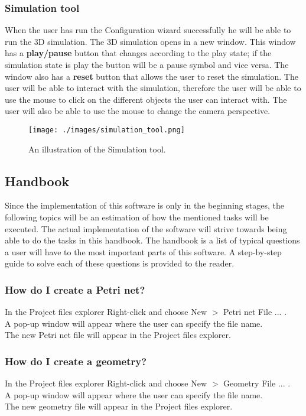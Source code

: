 \documentclass[fontsize=12pt, paper=a4]{article}
\begin{document}
\subsubsection{Simulation tool}
When the user has run the Configuration wizard successfully he will be able to run the 3D simulation. The 3D simulation opens in a new window. This window has a \textbf{play/pause} button that changes according to the play state; if the simulation state is play the button will be a pause symbol and vice versa. The window also has a \textbf{reset} button that allows the user to reset the simulation.
The user will be able to interact with the simulation, therefore the user will be able to use the mouse to click on the different objects the user can interact with. The user will also be able to use the mouse to change the camera perspective.

\begin{figure}[H]
\begin{center}
\texttt{[image: ./images/simulation\_tool.png]}
\caption{An illustration of the Simulation tool.}
\label{fig:simulation_tool.}
\end{center}
\end{figure}

\subsection{Handbook}
Since the implementation of this software is only in the beginning stages, the following topics will be an estimation of how the mentioned tasks will be executed. The actual implementation of the software will strive towards being able to do the tasks in this handbook. 
The handbook is a list of typical questions a user will have to the most important parts of this software. A step-by-step guide to solve each of these questions is provided to the reader.

\subsubsection{How do I create a Petri net?}
In the Project files explorer Right-click and choose New $>$ Petri net File ... . \\
A pop-up window will appear where the user can specify the file name. \\
The new Petri net file will appear in the Project files explorer.   

\subsubsection{How do I create a geometry?}
In the Project files explorer Right-click and choose New $>$ Geometry File ... .  \\
A pop-up window will appear where the user can specify the file name. \\
The new geometry file will appear in the Project files explorer.   
\end{document}
